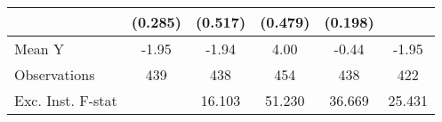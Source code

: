 {\begin{tabular}{l*{5}{c}}
            &     (0.285)         &     (0.517)         &     (0.479)         &     (0.198)         &                     \\
\midrule
Mean Y      &       -1.95         &       -1.94         &        4.00         &       -0.44         &       -1.95         \\
Observations&         439         &         438         &         454         &         438         &         422         \\
Exc. Inst. F-stat&                     &      16.103         &      51.230         &      36.669         &      25.431         \\
\bottomrule
\end{tabular}
}
